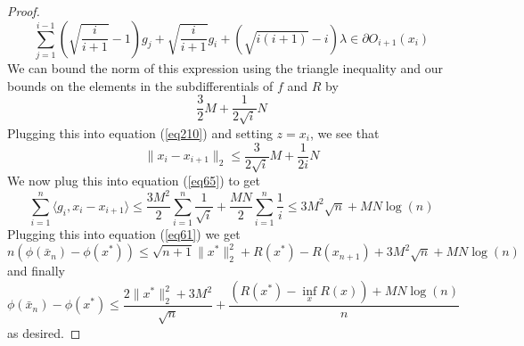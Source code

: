 \begin{proof}
\begin{equation}
    \displaystyle\sum_{j = 1}^{i-1} \left(\sqrt{\frac{i}{i+1}} - 1\right)g_j + \sqrt{\frac{i}{i+1}}g_i + (\sqrt{i(i+1)} - i)\lambda \in \partial O_{i+1}(x_i)
\end{equation}
We can bound the norm of this expression using the triangle inequality and our bounds on the elements in the subdifferentials of $f$ and
$R$ by
\begin{equation}
    \frac{3}{2}M + \frac{1}{2\sqrt{i}}N
\end{equation}
Plugging this into equation (\ref{eq210}) and setting $z = x_i$, we see that
\begin{equation}
    \|x_i - x_{i+1}\|_2 \leq \frac{3}{2\sqrt{i}}M + \frac{1}{2i}N
\end{equation}
We now plug this into equation (\ref{eq65}) to get
\begin{equation}
    \displaystyle\sum_{i=1}^n\langle g_i, x_i - x_{i+1}\rangle \leq \frac{3M^2}{2} \displaystyle\sum_{i=1}^n \frac{1}{\sqrt{i}} + \frac{MN}{2}\displaystyle\sum_{i=1}^n \frac{1}{i}\leq 3M^2 \sqrt{n} + MN\log(n)
\end{equation}
Plugging this into equation (\ref{eq61}) we get
\begin{equation}
    n(\phi(\bar{x}_n) - \phi(x^*)) \leq \sqrt{n+1}\|x^*\|_2^2 + R(x^*) - R(x_{n+1}) + 3M^2 \sqrt{n}+ MN\log(n)
\end{equation}
and finally
\begin{equation}
     \phi(\bar{x}_n) - \phi(x^*) \leq \frac{2\|x^*\|_2^2 + 3M^2}{\sqrt{n}} + \frac{(R(x^*) - \inf_x R(x)) + MN\log(n)}{n}
\end{equation}
as desired.
\end{proof}
\fi
